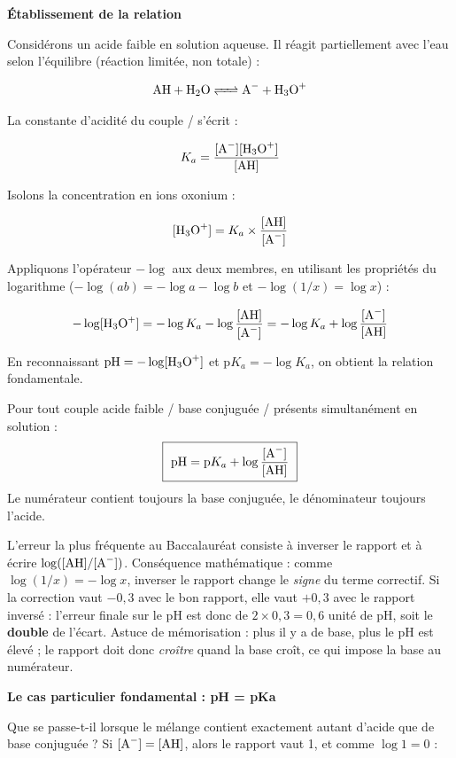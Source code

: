 \documentclass[11pt]{article}
\newcommand{\cle}[1]{{\popxbold\color{popdark}#1}}
\begin{document}
\textbf{Établissement de la relation}\par
Considérons un acide faible  en solution aqueuse. Il réagit partiellement avec l'eau selon l'équilibre (réaction limitée, non totale) :

\[ \ce{AH + H2O <=> A- + H3O+} \]

La constante d'acidité du couple / s'écrit :

\[ K_a = \dfrac{[\ce{A-}][\ce{H3O+}]}{[\ce{AH}]} \]

Isolons la concentration en ions oxonium :

\[ [\ce{H3O+}] = K_a \times \dfrac{[\ce{AH}]}{[\ce{A-}]} \]

Appliquons l'opérateur $-\log$ aux deux membres, en utilisant les propriétés du logarithme ($-\log(ab) = -\log a - \log b$ et $-\log(1/x) = \log x$) :

\[ -\log[\ce{H3O+}] = -\log K_a - \log\dfrac{[\ce{AH}]}{[\ce{A-}]} = -\log K_a + \log\dfrac{[\ce{A-}]}{[\ce{AH}]} \]

En reconnaissant $\text{pH} = -\log[\ce{H3O+}]$ et $\text{p}K_a = -\log K_a$, on obtient la relation fondamentale.

\begin{aretenir}
Pour tout couple acide faible / base conjuguée / présents simultanément en solution :
\[ \boxed{\ \text{pH} = \text{p}K_a + \log\dfrac{[\ce{A-}]}{[\ce{AH}]}\ } \]
Le numérateur contient toujours la \cle{base} conjuguée, le dénominateur toujours l'\cle{acide}.
\end{aretenir}

\begin{attention}
L'erreur la plus fréquente au Baccalauréat consiste à inverser le rapport et à écrire $\log([\ce{AH}]/[\ce{A-}])$. Conséquence mathématique : comme $\log(1/x) = -\log x$, inverser le rapport change le \emph{signe} du terme correctif. Si la correction vaut $-0{,}3$ avec le bon rapport, elle vaut $+0{,}3$ avec le rapport inversé : l'erreur finale sur le pH est donc de $2 \times 0{,}3 = 0{,}6$ unité de pH, soit le \textbf{double} de l'écart. Astuce de mémorisation : plus il y a de base, plus le pH est élevé ; le rapport doit donc \emph{croître} quand la base croît, ce qui impose la base au numérateur.
\end{attention}

\textbf{Le cas particulier fondamental : pH = pKa}\par
Que se passe-t-il lorsque le mélange contient exactement autant d'acide que de base conjuguée ? Si $[\ce{A-}] = [\ce{AH}]$, alors le rapport vaut 1, et comme $\log 1 = 0$ :
\end{document}
